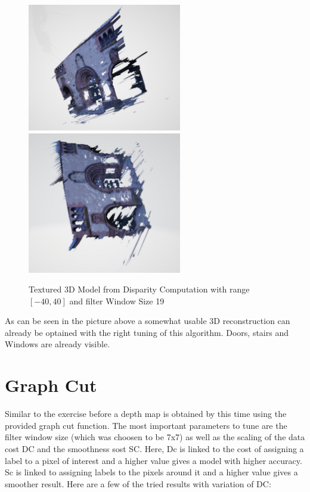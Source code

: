 \documentclass[12pt]{article}
\begin{document}
\begin{figure}[H]
	\centering
	\includegraphics[width=0.6\textwidth]{dc_model_19.jpg}
	\includegraphics[width=0.6\textwidth]{dc_model_19_2.jpg}
	\caption{Textured 3D Model from Disparity Computation with range $[-40, 40]$ and filter Window Size 19}
	\label{fig1}
\end{figure}

As can be seen in the picture above a somewhat usable 3D reconstruction can already be optained with the right tuning of this algorithm. Doors, stairs and Windows are already visible.  

\section{Graph Cut}

Similar to the exercise before a depth map is obtained by this time using the provided graph cut function. The most important parameters to tune are the filter window size (which was choosen to be 7x7) as well as the scaling of the data cost DC and the smoothness sost SC. Here, Dc is linked to the cost of assigning a label to a pixel of interest and a higher value gives a model with higher accuracy. Sc is linked to assigning labels to the pixels around it and a higher value gives a smoother result.
\vspace{5mm}
\newline
Here are a few of the tried results with variation of DC: 
 
\end{document}
